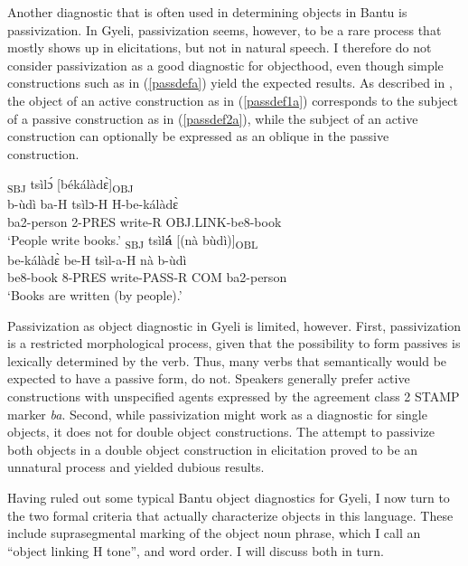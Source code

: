 Another diagnostic that is often used in determining objects in Bantu is passivization. In Gyeli, passivization seems, however, to be a rare process that mostly shows up in elicitations, but not in natural speech. I therefore do not consider passivization as a good diagnostic for objecthood, even though simple constructions such as in (\ref{passdefa}) yield the expected results. As described in , the object of an active construction as in (\ref{passdef1a}) corresponds to the subject of a passive construction as in (\ref{passdef2a}), while the subject of an active construction can optionally be expressed as an oblique in the passive construction.

\begin{exe}
\ex\label{passdefa}
\begin{xlist}
\ex \label{passdef1a}
  \glll  [bùdì bá]\textsubscript{SBJ} tsìlɔ́ [békálàdɛ̀]\textsubscript{OBJ}\\
	b-ùdì ba-H tsìlɔ-H H-be-kálàdɛ̀ \\
             ba2-person 2-PRES write-R OBJ.LINK-be8-book  \\
    \trans `People write books.'
\ex\label{passdef2a}
 \glll  [bèkálàdɛ̀ bé]\textsubscript{SBJ} tsìl{\bfseries á} [(nà bùdì)]\textsubscript{OBL} \\
	be-kálàdɛ̀ be-H tsìl-a-H nà b-ùdì \\
         be8-book 8-PRES write-PASS-R COM ba2-person  \\
    \trans `Books are written (by people).'
\end{xlist}
\end{exe}

Passivization as object diagnostic in Gyeli is limited, however. First, passivization is a restricted morphological process, given that the possibility to form passives is lexically determined by the verb. Thus, many verbs that semantically would be expected to have a passive form, do not. Speakers generally prefer active constructions with unspecified agents expressed by the agreement class 2 STAMP marker {\itshape ba}. Second, while passivization might work as a diagnostic for single objects, it does not for double object constructions. The attempt to passivize both objects in a double object construction in elicitation proved to be an unnatural process and yielded dubious results.

Having ruled out some typical Bantu object diagnostics for Gyeli, I now turn to the two formal criteria that actually characterize objects in this language. These include suprasegmental marking of the object noun phrase, which I call an ``object linking H tone'', and word order. I will discuss both in turn.  



